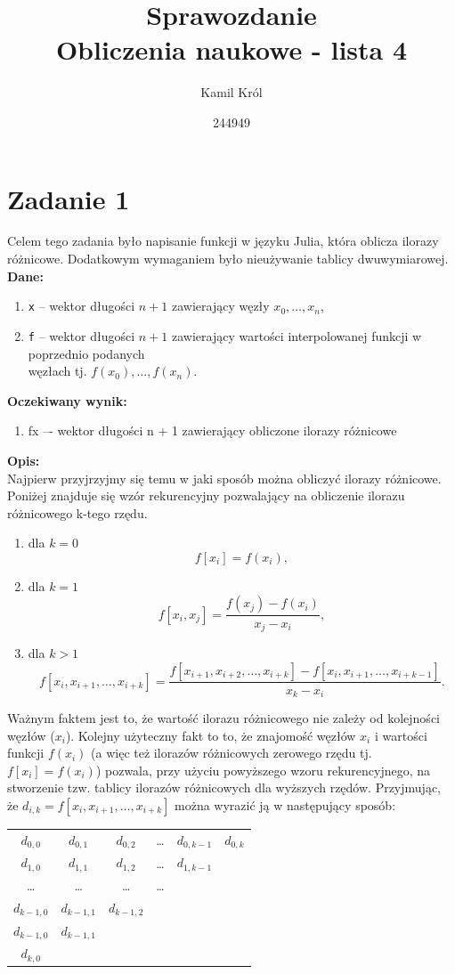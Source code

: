 \documentclass[]{article}
\title{
	Sprawozdanie \\
	\large 
	Obliczenia naukowe - lista 4}
\author{Kamil Król}
\date{244949}
\begin{document}
	
	\maketitle
	
	\section*{Zadanie 1}
	Celem tego zadania było napisanie funkcji w języku Julia, która oblicza ilorazy różnicowe. Dodatkowym wymaganiem było nieużywanie tablicy dwuwymiarowej.\\
	\textbf{Dane:}
	\begin{enumerate}[]
		\item \texttt{x} -- wektor długości $n+1$ zawierający węzły $x_0, \ldots, x_n$,
		\item \texttt{f} -- wektor długości $n+1$ zawierający wartości interpolowanej funkcji w poprzednio podanych\\ węzłach tj. $f(x_0), \ldots, f(x_n)$.
	\end{enumerate}
	\textbf{Oczekiwany wynik:}
	\begin{enumerate}[]
		\item fx –- wektor długości n + 1 zawierający obliczone ilorazy różnicowe
	\end{enumerate}
	\textbf{Opis:}\\
	Najpierw przyjrzyjmy się temu w jaki sposób można obliczyć ilorazy różnicowe.
	Poniżej znajduje się wzór rekurencyjny pozwalający na obliczenie ilorazu różnicowego k-tego rzędu.
	\begin{enumerate}[]
		\item dla $k = 0$  $$f[x_i] = f(x_i),$$
		\item dla $k = 1$  $$f[x_i,x_j] = \frac{f(x_j) - f(x_i)}{x_j - x_i},$$  
		\item dla $k > 1$  $$f[x_i,x_{i+1}, \ldots, x_{i+k}] = \frac{f[x_{i+1},x_{i+2}, \ldots, x_{i+k}] - f[x_{i}, x_{i+1}, \ldots, x_{i+k-1}]}{x_k - x_i}.$$
	\end{enumerate}
	Ważnym faktem jest to, że wartość ilorazu różnicowego nie zależy od kolejności węzłów ($x_i$). Kolejny użyteczny fakt to to, że 
	znajomość węzłów $x_i$ i wartości funkcji $f(x_i)$ (a więc też ilorazów różnicowych zerowego rzędu tj. $f[x_i] = f(x_i)$) pozwala, przy użyciu powyższego wzoru rekurencyjnego, na stworzenie tzw. tablicy ilorazów różnicowych dla wyższych rzędów. Przyjmując, że $d_{i,k} = f[x_i,x_{i+1}, \ldots, x_{i+k}]$ można wyrazić ją w następujący sposób:
\begin{table}[!htbp]
	\centering
	\begin{tabular}{cccccc}
		$d_{0,0}$ & $d_{0,1}$ & $d_{0,2}$ & \ldots & $d_{0,k-1}$ & $d_{0,k}$ \\
		$d_{1,0}$ & $d_{1,1}$ & $d_{1,2}$ &\ldots & $d_{1,k-1}$ & \\
		\ldots & \ldots & \ldots & \ldots && \\
		$d_{k-1,0}$ & $d_{k-1,1}$ & $d_{k-1,2}$ &&& \\
		$d_{k-1,0}$ & $d_{k-1,1}$ &&&& \\
		$d_{k,0}$ &&&&& \\
	\end{tabular}
\end{table}
\end{document}
